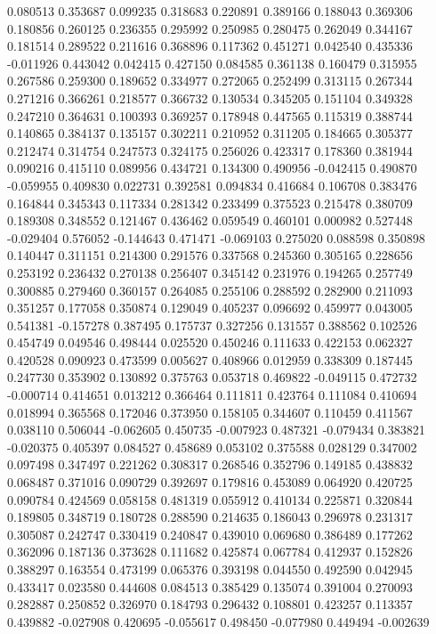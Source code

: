 0.080513
0.353687
0.099235
0.318683
0.220891
0.389166
0.188043
0.369306
0.180856
0.260125
0.236355
0.295992
0.250985
0.280475
0.262049
0.344167
0.181514
0.289522
0.211616
0.368896
0.117362
0.451271
0.042540
0.435336
-0.011926
0.443042
0.042415
0.427150
0.084585
0.361138
0.160479
0.315955
0.267586
0.259300
0.189652
0.334977
0.272065
0.252499
0.313115
0.267344
0.271216
0.366261
0.218577
0.366732
0.130534
0.345205
0.151104
0.349328
0.247210
0.364631
0.100393
0.369257
0.178948
0.447565
0.115319
0.388744
0.140865
0.384137
0.135157
0.302211
0.210952
0.311205
0.184665
0.305377
0.212474
0.314754
0.247573
0.324175
0.256026
0.423317
0.178360
0.381944
0.090216
0.415110
0.089956
0.434721
0.134300
0.490956
-0.042415
0.490870
-0.059955
0.409830
0.022731
0.392581
0.094834
0.416684
0.106708
0.383476
0.164844
0.345343
0.117334
0.281342
0.233499
0.375523
0.215478
0.380709
0.189308
0.348552
0.121467
0.436462
0.059549
0.460101
0.000982
0.527448
-0.029404
0.576052
-0.144643
0.471471
-0.069103
0.275020
0.088598
0.350898
0.140447
0.311151
0.214300
0.291576
0.337568
0.245360
0.305165
0.228656
0.253192
0.236432
0.270138
0.256407
0.345142
0.231976
0.194265
0.257749
0.300885
0.279460
0.360157
0.264085
0.255106
0.288592
0.282900
0.211093
0.351257
0.177058
0.350874
0.129049
0.405237
0.096692
0.459977
0.043005
0.541381
-0.157278
0.387495
0.175737
0.327256
0.131557
0.388562
0.102526
0.454749
0.049546
0.498444
0.025520
0.450246
0.111633
0.422153
0.062327
0.420528
0.090923
0.473599
0.005627
0.408966
0.012959
0.338309
0.187445
0.247730
0.353902
0.130892
0.375763
0.053718
0.469822
-0.049115
0.472732
-0.000714
0.414651
0.013212
0.366464
0.111811
0.423764
0.111084
0.410694
0.018994
0.365568
0.172046
0.373950
0.158105
0.344607
0.110459
0.411567
0.038110
0.506044
-0.062605
0.450735
-0.007923
0.487321
-0.079434
0.383821
-0.020375
0.405397
0.084527
0.458689
0.053102
0.375588
0.028129
0.347002
0.097498
0.347497
0.221262
0.308317
0.268546
0.352796
0.149185
0.438832
0.068487
0.371016
0.090729
0.392697
0.179816
0.453089
0.064920
0.420725
0.090784
0.424569
0.058158
0.481319
0.055912
0.410134
0.225871
0.320844
0.189805
0.348719
0.180728
0.288590
0.214635
0.186043
0.296978
0.231317
0.305087
0.242747
0.330419
0.240847
0.439010
0.069680
0.386489
0.177262
0.362096
0.187136
0.373628
0.111682
0.425874
0.067784
0.412937
0.152826
0.388297
0.163554
0.473199
0.065376
0.393198
0.044550
0.492590
0.042945
0.433417
0.023580
0.444608
0.084513
0.385429
0.135074
0.391004
0.270093
0.282887
0.250852
0.326970
0.184793
0.296432
0.108801
0.423257
0.113357
0.439882
-0.027908
0.420695
-0.055617
0.498450
-0.077980
0.449494
-0.002639
